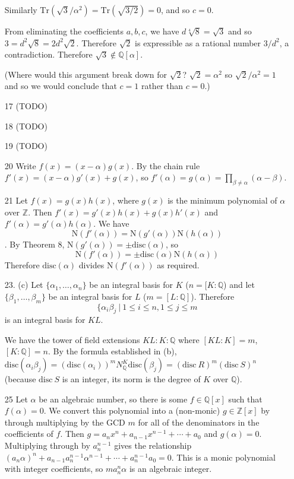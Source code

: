 \documentclass{article}
\newcommand{\Q}[0]{\mathbb{Q}}
\newcommand{\Z}[0]{\mathbb{Z}}
\newcommand{\qext}[1]{\mathbb{Q}[#1]}
\newcommand{\trace}[1]{\text{Tr}(#1)}
\newcommand{\norm}[1]{\text{N}(#1)}
\newcommand{\disc}[1]{\text{disc}(#1)}
\begin{document}
\begin{enumerate}
Similarly $\trace{\sqrt{3}/\alpha^2} = \trace{\sqrt{3/2}} = 0$, and so $c = 0$.

From eliminating the coefficients $a, b, c$, we have $d\sqrt[4]{8} = \sqrt{3}$ and so $3 = d^2\sqrt{8} = 2d^2\sqrt{2}$.  Therefore $\sqrt{2}$ is expressible as a rational number $3/d^2$, a contradiction.  Therefore $\sqrt{3} \not\in \qext{\alpha}$.

(Where would this argument break down for $\sqrt{2}$?  $\sqrt{2} = \alpha^2$ so $\sqrt{2} / \alpha^2 = 1$ and so we would conclude that $c = 1$ rather than $c = 0$.)

\item[17]{(TODO)}

\item[18]{(TODO)}

\item[19]{(TODO)}

\item[20] Write $f(x) = (x - \alpha)g(x)$.  By the chain rule $f'(x) = (x - \alpha)g'(x) + g(x)$, so $f'(\alpha) = g(\alpha) = \prod_{\beta \neq \alpha} (\alpha - \beta)$.

\item[21] Let $f(x) = g(x) h(x)$, where $g(x)$ is the minimum polynomial of $\alpha$ over $\mathbb{Z}$.  Then $f'(x) = g'(x)h(x) + g(x) h'(x)$ and $f'(\alpha) = g'(\alpha)h(\alpha)$.  We have \[ \norm{f'(\alpha)} = \norm{g'(\alpha)}\norm{h(\alpha)} \].  By Theorem 8, $\norm{g'(\alpha)} = \pm \disc{\alpha}$, so \[ \norm{f'(\alpha)} = \pm \disc{\alpha}\norm{h(\alpha)} \]
Therefore $\disc{\alpha}$ divides $\norm{f'(\alpha)}$ as required.

\item[23. (c)] Let $\{ \alpha_1, \ldots, \alpha_n \}$ be an integral basis for $K$ ($n = [K : \Q$) and let $\{ \beta_1, \ldots, \beta_m \}$ be an integral basis for $L$ ($m = [L : \Q]$).  Therefore \[ \{ \alpha_i \beta_j \ |\ 1 \le i \le n, 1 \le j \le m \] is an integral basis for $KL$.

We have the tower of field extensions $KL : K : \Q$ where $[KL : K] = m$, $[K : \Q] = n$.  By the formula established in (b), $\disc{\alpha_i \beta_j} = (\disc{\alpha_i})^m N^{K}_{\Q} \disc{\beta_j} = (\text{disc}\ R)^m (\text{disc}\ S)^n$ (because $\text{disc}\ S$ is an integer, its norm is the degree of $K$ over $\Q$).

\item[25] Let $\alpha$ be an algebraic number, so there is some $f \in \Q[x]$ such that $f(\alpha) = 0$.  We convert this polynomial into a (non-monic) $g \in \Z[x]$ by through multiplying by the GCD $m$ for all of the denominators in the coefficients of $f$.  Then $g = a_n x^n + a_{n-1} x^{n-1} + \cdots + a_0$ and $g(\alpha) = 0$.  Multiplying through by $a_n ^ {n - 1}$ gives the relationship $(a_n \alpha)^n + a_{n-1} a_n^{n- 1} \alpha^{n - 1} + \cdots + a_n^{n-1} a_0 = 0$.  This is a monic polynomial with integer coefficients, so $m a_n^{n} \alpha$ is an algebraic integer.


\end{enumerate}
\end{document}
